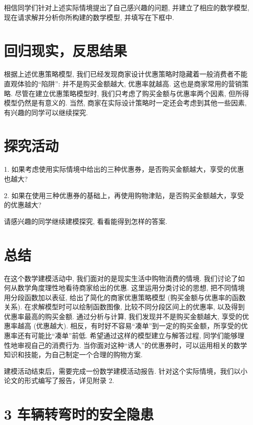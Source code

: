 \documentclass[10pt]{article}
\begin{document}
相信同学们针对上述实际情境提出了自己感兴趣的问题, 并建立了相应的数学模型, 现在请求解并分析你所构建的数学模型, 并填写在下框中.

\section*{回归现实，反思结果}

根据上述优惠策略模型, 我们已经发现商家设计优惠策略时隐藏着一般消费者不能直观体验的“陷阱”: 并不是购买金额越大, 优惠率就越高. 这也是商家常用的营销策略. 尽管在建立优惠策略模型时, 我们只考虑了购买金额与优惠率两个因素, 但所得模型仍然是有意义的. 当然, 商家在实际设计策略时一定还会考虑到其他一些因素, 有兴趣的同学可以继续探究.

\section*{探究活动}

1. 如果考虑使用实际情境中给出的三种优惠券，是否购买金额越大，享受的优惠也越大?

2. 如果在使用三种优惠券的基础上，再使用购物津贴，是否购买金额越大，享受的优惠越大?

请感兴趣的同学继续建模探究, 看看能得到怎样的答案.

\section*{总结}

在这个数学建模活动中, 我们面对的是现实生活中购物消费的情境. 我们讨论了如何从数学角度理性地看待商家给出的优惠. 这里运用分类讨论的思想, 把不同情境用分段函数加以表征, 给出了简化的商家优惠策略模型 (购买金额与优惠率的函数关系). 在求解模型时可以绘制函数图像, 比较不同分段区间上的优惠率, 以及得到优惠率最高的购买金额. 通过分析与计算, 我们发现并不是购买金额越大, 享受的优惠率越高 (优惠越大). 相反，有时好不容易“凑单”到一定的购买金额，所享受的优惠率还有可能比“凑单”前低. 希望通过这样的模型建立与解答过程, 同学们能够理性地审视自己的消费行为. 当你面对这种“诱人”的优惠券时，可以运用相关的数学知识和技能，为自己制定一个合理的购物方案.

建模活动结束后，需要完成一份数学建模活动报告. 针对这个实际情境，我们以小论文的形式编写了报告，详见附录 2.



\section*{3 车辆转弯时的安全隐患}
\end{document}

